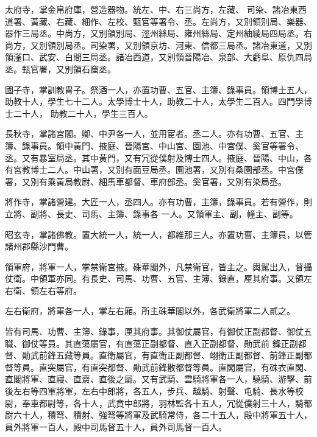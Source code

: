 \begin{pinyinscope}
 太府寺，掌金帛府庫，營造器物。統左、中、右三尚方，左藏、
 司染、諸冶東西道署、黃藏、右藏、細作、左校、甄官等署令、丞。左尚方，又別領別局、樂器、器作三局丞。中尚方，又別領別局、涇州絲局、雍州絲局、定州紬綾局四局丞。右尚方，又別領別局丞。司染署，又別領京坊、河東、信都三局丞。諸冶東道，又別領滏口、武安、白間三局丞。諸冶西道，又別領晉陽冶、泉部、大虧阜、原仇四局丞。甄官署，又別領石窟丞。



 國子寺，掌訓教胄子。祭酒一人，亦置功曹、五官、主簿、錄事員。領博士五人，助教十人，學生七十二人。太學博士十人，助教二十人，太學生二百人。四門學博士二十人，
 助教二十人，學生三百人。



 長秋寺，掌諸宮閣。卿、中尹各一人，並用宦者。丞二人。亦有功曹、五官、主簿、錄事員。領中黃門、掖庭、晉陽宮、中山宮、園池、中宮僕、奚官等署令、丞。又有暴室局丞。其中黃門，又有冗從僕射及博士四人。掖庭、晉陽、中山，各有宮教博士二人。中山署，又別有面豆局丞。園池署，又別有桑園部丞。中宮僕署，又別有乘黃局教尉、細馬車都督、車府部丞。奚官署，又別有染局丞。



 將作寺，掌諸營建。大匠一人，丞四人。亦有功曹，主簿，錄事員。若有營作，則立將、副將、長史、司馬、主簿、錄事各
 一人。又領軍主、副，幢主、副等。



 昭玄寺，掌諸佛教。置大統一人，統一人，都維那三人。亦置功曹、主簿員，以管諸州郡縣沙門曹。



 領軍府，將軍一人，掌禁衛宮掖。硃華閣外，凡禁衛官，皆主之。輿駕出入，督攝仗衛。中領軍亦同。有長史、司馬、功曹、五官、主簿、錄直，厘其府事。又領左右衛、領左右等府。



 左右衛府，將軍各一人，掌左右廂。所主硃華閣以外，各武衛將軍二人貳之。



 皆有司馬、功曹、主簿、錄事，厘其府事。其御仗屬官，有御仗正副都督、御仗五職、御仗等員。其直蕩屬官，有直蕩正副都督、直入正副都督、勛武前
 鋒正副都督、勛武前鋒五藏等員。直衛屬官，有直衛正副都督、翊衛正副都督、前鋒正副都督等員。直突屬官，有直突都督、勛武前鋒散都督等員。直閣屬官，有硃衣直閣、直閣將軍、直寢、直齋、直後之屬。又有武騎、雲騎將軍各一人，驍騎、游擊、前後左右等四軍將軍，左右中郎將，各五人，步兵、越騎、射聲、屯騎、長水等校尉，奉車都尉等，各十人，武賁中郎將，羽林監各十五人，冗從僕射三十人，騎都尉六十人，積弩、積射、強弩等將軍及武騎常侍，各二十五人，殿中將軍五十人，員外將軍一百人，殿中司馬督五十人，員外司馬督一百人。




\end{pinyinscope}
